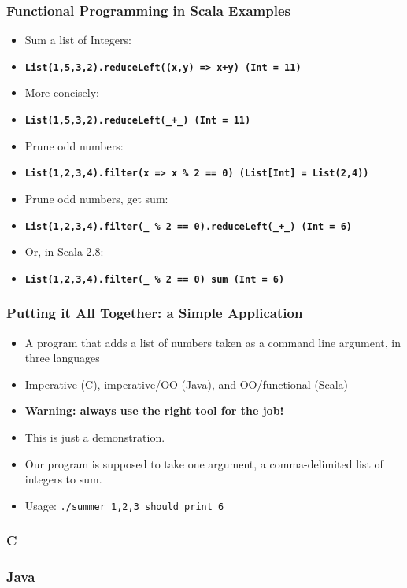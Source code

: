\begin{frame} 
\frametitle{Functional Programming in Scala Examples}
\begin{itemize}
  \item<1-> Sum a list of Integers:
  \item<1-> \tt\small\textbf{List(1,5,3,2).reduceLeft((x,y) => x+y) (Int = 11)}
  \item<2-> More concisely:
  \item<2-> \tt\small\textbf{List(1,5,3,2).reduceLeft(\_+\_) (Int = 11)}
  \item<3-> Prune odd numbers:
  \item<3-> \tt\small\textbf{List(1,2,3,4).filter(x => x \% 2 == 0) (List[Int] = List(2,4))}
  \item<4-> Prune odd numbers, get sum:
  \item<4-> \tt\small\textbf{List(1,2,3,4).filter(\_ \% 2 == 0).reduceLeft(\_+\_) (Int = 6)}
  \item<5-> Or, in Scala 2.8:
  \item<5-> \tt\small\textbf{List(1,2,3,4).filter(\_ \% 2 == 0) sum (Int = 6)}
\end{itemize}
\end{frame} 

\begin{frame} 
\frametitle{Putting it All Together: a Simple Application}
\begin{itemize}
  \item<1-> A program that adds a list of numbers taken as a command line argument, in three languages 
  \item<2-> Imperative (C), imperative/OO (Java), and OO/functional (Scala)
  \item<3-> \textbf{Warning: always use the right tool for the job!}
  \item<3-> This is just a demonstration.
  \item<4-> Our program is supposed to take one argument, a comma-delimited list of integers to sum.
  \item<4-> Usage: \tt{./summer 1,2,3} should print 6
\end{itemize}
\end{frame} 

\begin{frame} 
\frametitle{C}
\tt\tiny{

}
\end{frame} 

\begin{frame} 
\frametitle{Java}
\tt\tiny{

}
\end{frame} 

